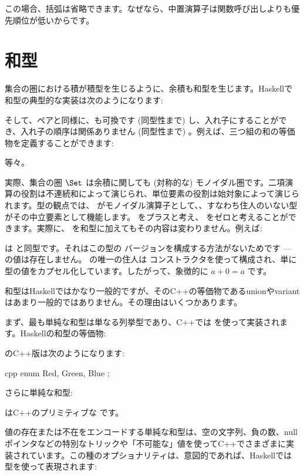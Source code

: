 この場合、括弧は省略できます。なぜなら、中置演算子は関数呼び出しよりも優先順位が低いからです。

\section{和型}

集合の圏における積が積型を生じるように、余積も和型を生じます。Haskellで和型の典型的な実装は次のようになります: 

そして、ペアと同様に、も可換です (同型性まで) し、入れ子にすることができ、入れ子の順序は関係ありません (同型性まで) 。例えば、三つ組の和の等価物を定義することができます: 

等々。

実際、集合の圏 $\Set$ は余積に関しても (対称的な) モノイダル圏です。二項演算の役割は不連続和によって演じられ、単位要素の役割は始対象によって演じられます。型の観点では、 がモノイダル演算子として、、すなわち住人のいない型がその中立要素として機能します。 をプラスと考え、 をゼロと考えることができます。実際に、 を和型に加えてもその内容は変わりません。例えば: 

は  と同型です。それはこの型の  バージョンを構成する方法がないためです ---  の値は存在しません。  の唯一の住人は  コンストラクタを使って構成され、単に  型の値をカプセル化しています。したがって、象徴的に $a + 0 = a$ です。

和型はHaskellではかなり一般的ですが、そのC++の等価物であるunionやvariantはあまり一般的ではありません。その理由はいくつかあります。

まず、最も単純な和型は単なる列挙型であり、C++では  を使って実装されます。Haskellの和型の等価物: 

のC++版は次のようになります: 

\begin{snip}{cpp}
enum { Red, Green, Blue };
\end{snip}
さらに単純な和型: 

はC++のプリミティブな  です。

値の存在または不在をエンコードする単純な和型は、空の文字列、負の数、nullポインタなどの特別なトリックや「不可能な」値を使ってC++でさまざまに実装されています。この種のオプショナリティは、意図的であれば、Haskellでは  型を使って表現されます: 

